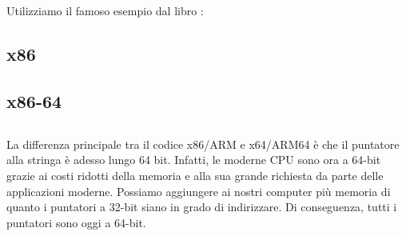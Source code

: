 \section{\HelloWorldSectionName}
\label{sec:helloworld}

Utilizziamo il famoso esempio dal libro \KRBook:



\subsection{x86}




\subsection{x86-64}







\subsection{\Conclusion{}}

La differenza principale tra il codice x86/ARM e x64/ARM64 è che il puntatore alla stringa è adesso lungo 64 bit.
Infatti, le moderne \ac{CPU} sono ora a 64-bit grazie ai costi ridotti della memoria e alla sua grande richiesta da parte delle applicazioni moderne. 
Possiamo aggiungere ai nostri computer più memoria di quanto i puntatori a 32-bit siano in grado di indirizzare.  
Di conseguenza, tutti i puntatori sono oggi a 64-bit.


